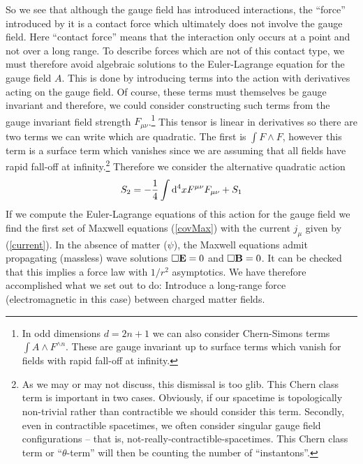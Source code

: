 \documentclass[12pt]{article}
\begin{document}

So we see that although the gauge field has introduced interactions, the ``force'' introduced by it is a contact force which ultimately does not involve the gauge field. Here ``contact force'' means that the interaction only occurs at a point and not over a long range. To describe forces which are not of this contact type, we must therefore avoid algebraic solutions to the Euler-Lagrange equation for the gauge field $A$. This is done by introducing terms into the action with derivatives acting on the gauge field. Of course, these terms must themselves be gauge invariant and therefore, we could consider constructing such terms from the gauge invariant field strength $F_{\mu \nu}$.\footnote{In odd dimensions $d=2n+1$ we can also consider Chern-Simons terms $\int A\wedge F^{\wedge n}$. These are gauge invariant up to surface terms which vanish for fields with rapid fall-off at infinity.} This tensor is linear in derivatives so there are two terms we can write which are quadratic. The first is $\int F\wedge F$, however this term is a surface term which vanishes since we are assuming that all fields have rapid fall-off at infinity.\footnote{As we may or may not discuss, this dismissal is too glib. This Chern class term is important in two cases. Obviously, if our spacetime is topologically non-trivial rather than contractible we should consider this term. Secondly, even in contractible spacetimes, we often consider singular gauge field configurations -- that is, not-really-contractible-spacetimes. This Chern class term or ``$\theta$-term'' will then be counting the number of ``instantons''.} Therefore we consider the alternative quadratic action 
\begin{eqnarray}
S_2=-{1\over 4} \int {\rm d}^4 x   F^{\mu \nu}F_{\mu \nu}+S_1
\end{eqnarray}
If we compute the Euler-Lagrange equations of this action for the gauge field we find the first set of Maxwell equations (\ref{covMax}) with the current $j_\mu$ given by (\ref{current}). In the absence of matter ($\psi$), the Maxwell equations admit propagating (massless) wave solutions $\Box {\bf E}=0$ and $\Box {\bf B}=0$. It can be checked that this implies a force law with $1/r^2$ asymptotics. We have therefore accomplished what we set out to do: Introduce a long-range force (electromagnetic in this case) between charged matter fields. 
\end{document}
